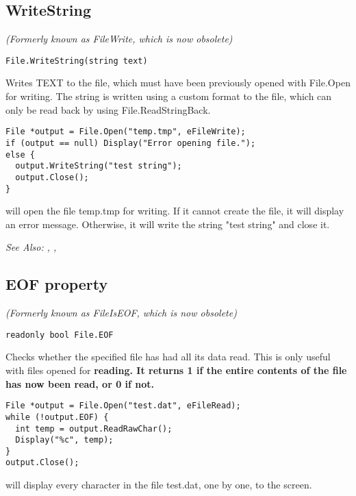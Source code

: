 \subsection{WriteString}\label{File.WriteString}%

\it{(Formerly known as FileWrite, which is now obsolete)}

\begin{verbatim}
File.WriteString(string text)
\end{verbatim}
Writes TEXT to the file, which must have been previously opened with
File.Open for writing. The string is written using a custom format to
the file, which can only be read back by using File.ReadStringBack.

\begin{verbatim}
File *output = File.Open("temp.tmp", eFileWrite);
if (output == null) Display("Error opening file.");
else {
  output.WriteString("test string");
  output.Close();
}
\end{verbatim}
will open the file temp.tmp for writing. If it cannot create the file, it will display
an error message. Otherwise, it will write the string "test string" and close it.

\it{See Also:} , ,


\subsection{EOF property}\label{File.EOF}%

\it{(Formerly known as FileIsEOF, which is now obsolete)}

\begin{verbatim}
readonly bool File.EOF
\end{verbatim}
Checks whether the specified file has had all its data read. This is only useful
with files opened for \bf{reading}. It returns 1 if the entire contents of the file
has now been read, or 0 if not.

\begin{verbatim}
File *output = File.Open("test.dat", eFileRead);
while (!output.EOF) {
  int temp = output.ReadRawChar();
  Display("%c", temp);
}
output.Close();
\end{verbatim}
will display every character in the file test.dat, one by one, to the screen.

